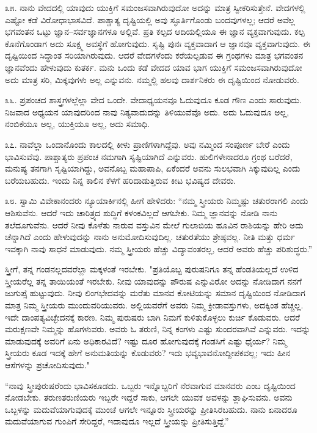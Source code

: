 ೩೫. ನಾನು ವೇದದಲ್ಲಿ ಯಾವುದು ಯುಕ್ತಿಗೆ ಸಮಂಜಸವಾಗಿರುವುದೋ ಅದನ್ನು ಮಾತ್ರ ಸ್ವೀಕರಿಸುತ್ತೇನೆ. ವೇದಗಳಲ್ಲಿ ಎಷ್ಟೋ ಕಡೆ ವಿರೋಧಾಭಾಸವಿದೆ. ಪಾಶ್ಚಾತ್ಯ ದೃಷ್ಟಿಯಲ್ಲಿ ಅವು ಸ್ಫೂರ್ತಿಗೊಂಡು ಬಂದವುಗಳಲ್ಲ; ಆದರೆ ಅವೆಲ್ಲ ಭಗವಂತನ ಒಟ್ಟು ಜ್ಞಾನ–ಸರ್ವಜ್ಞಾನಗಳೂ ಅಲ್ಲಿವೆ. ಪ್ರತಿ ಕಲ್ಪದ ಆದಿಯಲ್ಲಿಯೂ ಈ ಜ್ಞಾನ ವ್ಯಕ್ತವಾಗುವುದು. ಕಲ್ಪ ಕೊನೆಗೊಂಡಾಗ ಅದು ಸೂಕ್ಷ್ಮ ಅವಸ್ಥೆಗೆ ಹೋಗುವುದು. ಸೃಷ್ಟಿ ಪುನಃ ವ್ಯಕ್ತವಾದಾಗ ಆ ಜ್ಞಾನವೂ ವ್ಯಕ್ತವಾಗುವುದು. ಈ ದೃಷ್ಟಿಯಿಂದ ಸಿದ್ಧಾಂತ ಸರಿಯಾಗಿರುವುದು. ಆದರೆ ವೇದಗಳೆಂದು ಕರೆಯಲ್ಪಡುವ ಈ ಗ್ರಂಥಗಳು ಮಾತ್ರ ಭಗವಂತನ ಜ್ಞಾನವೆಂದು ಹೇಳುವುದು ಕುತರ್ಕ. ಮನು ಒಂದು ಕಡೆ ವೇದದ ಯಾವ ಭಾಗ ಯುಕ್ತಿಗೆ ಸಮಂಜಸವಾಗಿರುವುದೋ ಅದು ಮಾತ್ರ ಸರಿ, ಮಿಕ್ಕವುಗಳು ಅಲ್ಲ ಎನ್ನುವನು. ನಮ್ಮಲ್ಲಿ ಹಲವು ದಾರ್ಶನಿಕರು ಈ ದೃಷ್ಟಿಯಿಂದ ನೋಡುವರು.

೩೬. ಪ್ರಪಂಚದ ಶಾಸ್ತ್ರಗಳಲ್ಲೆಲ್ಲಾ ವೇದ ಒಂದೇ. ವೇದಾಧ್ಯಯನವೂ ಓದುವುದೂ ಕೂಡ ಗೌಣ ಎಂದು ಸಾರುವುದು. ನಿಜವಾದ ಅಧ್ಯಯನ ಯಾವುದರಿಂದ ನಾವು ನಿತ್ಯವಾದುದನ್ನು ತಿಳಿಯುವೆವೊ ಅದು. ಅದು ಓದುವುದೂ ಅಲ್ಲ, ನಂಬಿಕೆಯೂ ಅಲ್ಲ, ಯುಕ್ತಿಯೂ ಅಲ್ಲ, ಅದು ಸಮಾಧಿ.

೩೭. ನಾವೆಲ್ಲಾ ಒಂದಾನೊಂದು ಕಾಲದಲ್ಲಿ ಕೀಳು ಪ್ರಾಣಿಗಳಾಗಿದ್ದೆವು. ಅವು ನಮ್ಮಿಂದ ಸಂಪೂರ್ಣ ಬೇರೆ ಎಂದು ಭಾವಿಸುವೆವು. ಪಾಶ್ಚಾತ್ಯರು ಪ್ರಪಂಚ ನಮಗಾಗಿ ಸೃಷ್ಟಿಯಾಗಿದೆ ಎನ್ನುವರು. ಹುಲಿಗಳೇನಾದರೂ ಗ್ರಂಥ ಬರೆದರೆ, ಮನುಷ್ಯ ತನಗಾಗಿ ಸೃಷ್ಟಿಯಾಗಿದ್ದು, ಅವನೊಬ್ಬ ಮಹಾಪಾಪಿ, ಏಕೆಂದರೆ ಅವನು ಸುಲಭವಾಗಿ ಸಿಕ್ಕುವುದಿಲ್ಲ ಎಂದು ಬರೆಯಬಹುದು. ಇಂದು ನಿನ್ನ ಕಾಲಿನ ಕೆಳಗೆ ಹರಿದಾಡುತ್ತಿರುವ ಕೀಟ ಭವಿಷ್ಯದ ದೇವರು.

೩೮. ಸ್ವಾಮಿ ವಿವೇಕಾನಂದರು ನ್ಯೂಯಾರ್ಕಿನಲ್ಲಿ ಹೀಗೆ ಹೇಳಿದರು: “ನಮ್ಮ ಸ್ತ್ರೀಯರು ನಿಮ್ಮಷ್ಟು ಚತುರರಾಗಲಿ ಎಂದು ಆಶಿಸುವೆನು. ಆದರೆ ಇದು ಚಾರಿತ್ರ್ಯದ ಶುದ್ಧಿಗೆ ಕಳಂಕವಿಲ್ಲದೆ ಆಗಬೇಕು. ನಿಮ್ಮ ಜ್ಞಾನವನ್ನು ನೋಡಿ ನಾನು ತಲೆದೂಗುವೆನು. ಆದರೆ ನೀವು ಕೊಳೆತು ನಾರುವ ವಸ್ತುವಿನ ಮೇಲೆ ಗುಲಾಬಿಯ ಹೂವಿನ ರಾಶಿಯನ್ನು ಹೇರಿ ಅದು ಚೆನ್ನಾಗಿದೆ ಎಂದು ಹೇಳುವುದನ್ನು ನಾನು ಅನುಮೋದಿಸುವುದಿಲ್ಲ. ಚತುರತೆಯು ಶ್ರೇಷ್ಠವಲ್ಲ. ನೀತಿ ಮತ್ತು ಧರ್ಮ ಇವಕ್ಕಾಗಿ ನಾವು ಸಾಧನೆ ಮಾಡುವುದು. ನಮ್ಮ ಸ್ತ್ರೀಯರು ಹೆಚ್ಚು ವಿದ್ಯಾವಂತರಲ್ಲ, ಆದರೆ ಅವರು ಹೆಚ್ಚು ಪರಿಶುದ್ಧರು.”

ಸ್ತ್ರೀಗೆ, ತನ್ನ ಗಂಡನಲ್ಲದವರೆಲ್ಲಾ ಮಕ್ಕಳಂತೆ ಇರಬೇಕು. "ಪ್ರತಿಯೊಬ್ಬ ಪುರುಷನಿಗೂ ತನ್ನ ಹೆಂಡತಿಯಲ್ಲದೆ ಉಳಿದ ಸ್ತ್ರೀಯರೆಲ್ಲ ತನ್ನ ತಾಯಿಯಂತೆ ಇರಬೇಕು. ನೀವು ಯಾವುದನ್ನು ಪೌರುಷ  ಎನ್ನುವಿರೋ ಅದನ್ನು ನೋಡಿದಾಗ ನನಗೆ ಜುಗುಪ್ಸೆ ಹುಟ್ಟುವುದು. ನೀವು ಲಿಂಗಭೇದವನ್ನು ಮರೆತು ಮಾನವ ಕೋಟಿಯನ್ನು ಸಮಾನ ದೃಷ್ಟಿಯಿಂದ ನೋಡಿದಾಗ ಮಾತ್ರ ನಿಮ್ಮ ಸ್ತ್ರೀಯರು ಮುಂದುವರಿಯುವರು. ಅಲ್ಲಿಯವರೆಗೆ ಅವರು ನಿಮ್ಮ ಕ್ರೀಡಾವಸ್ತುಗಳು, ಅದಕ್ಕಿಂತ ಹೆಚ್ಚಲ್ಲ. ಇದೇ ದಾಂಪತ್ಯವಿಚ್ಛೇದನಕ್ಕೆ ಕಾರಣ. ನಿಮ್ಮ ಪುರುಷರು ಬಾಗಿ ನಿಮಗೆ ಕುಳಿತುಕೊಳ್ಳಲು ಕುರ್ಚಿ ಕೊಡುವರು. ಆದರೆ ಮರುಕ್ಷಣವೇ ನಿಮ್ಮನ್ನು ಹೊಗಳುವರು. ಅವರು ಓ ತರುಣಿ, ನಿನ್ನ ಕಂಗಳು ಎಷ್ಟು ಸುಂದರವಾಗಿವೆ ಎನ್ನುವರು. ಇದನ್ನು ಮಾಡುವುದಕ್ಕೆ ಅವರಿಗೆ ಏನು ಅಧಿಕಾರವಿದೆ? ಇಷ್ಟು ದೂರ ಹೋಗುವುದಕ್ಕೆ ಗಂಡಸಿಗೆ ಎಷ್ಟು ಧೈರ್ಯ? ನಿಮ್ಮ ಸ್ತ್ರೀಯರು ಕೂಡ ಇದಕ್ಕೆ ಹೇಗೆ ಅನುಮತಿಯನ್ನು ಕೊಡುವರು? ಇದು ಭವ್ಯಭಾವನೋದ್ದೀಪಕವಲ್ಲ; ಇದು ಹೀನ ಆಸೆಗಳನ್ನು ಪ್ರಚೋದಿಸುವುದು."

“ನಾವು ಸ್ತ್ರೀಪುರುಷರೆಂದು ಭಾವಿಸಕೂಡದು. ಒಬ್ಬರು ಇನ್ನೊಬ್ಬರಿಗೆ ನೆರವಾಗುವ ಮಾನವರು ಎಂಬ ದೃಷ್ಟಿಯಿಂದ ನೋಡಬೇಕು. ತರುಣತರುಣಿಯರು ಇಬ್ಬರೇ ಇದ್ದರೆ ಸಾಕು, ಆಗಲೇ ಯುವಕ ಅವಳನ್ನು ಶ್ಲಾಘಿಸುವನು. ಅವನು ಒಬ್ಬಳನ್ನು ಮದುವೆಯಾಗುವುದಕ್ಕೆ ಮುಂಚೆ ಆಗಲೇ ಇನ್ನೂರು ಸ್ತ್ರೀಯರನ್ನು ಪ್ರೀತಿಸಿರಬಹುದು. ನಾನು ಏನಾದರೂ ಮದುವೆಯಾಗುವ ಗುಂಪಿಗೆ ಸೇರಿದ್ದರೆ, ಇದಾವುದೂ ಇಲ್ಲದೆ ಸ್ತ್ರೀಯನ್ನು ಪ್ರೀತಿಸುತ್ತಿದ್ದೆ.”

